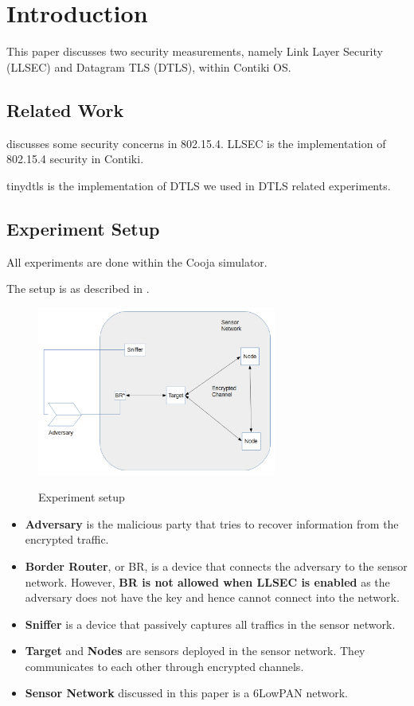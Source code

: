 \chapter{Introduction}
This paper discusses two security measurements, namely Link Layer Security (LLSEC) and Datagram TLS (DTLS), within Contiki OS.

\section{Related Work}
\cite{802154Sec} discusses some security concerns in 802.15.4.  LLSEC\cite{LLSEC} is the implementation of 802.15.4 security in Contiki.

tinydtls\cite{tinydtls} is the implementation of DTLS we used in DTLS related experiments.

\section{Experiment Setup}
All experiments are done within the Cooja simulator.

The setup is as described in .

\begin{figure}
\centering
{
	\includegraphics[width=0.7\textwidth,]{fig/setup.png}
}
\caption{Experiment setup} \label{fig: Setup}
\end{figure}

\begin{itemize}
\item{\bf Adversary} is the malicious party that tries to recover information from the encrypted traffic.
\item{\bf Border Router}, or BR, is a device that connects the adversary to the sensor network. However, \textbf{BR is not allowed when LLSEC is enabled} as the adversary does not have the key and hence cannot connect into the network. 
\item{\bf Sniffer} is a device that passively captures all traffics in the sensor network. 
\item{\bf Target} and {\bf Nodes} are sensors deployed in the sensor network. They communicates to each other through encrypted channels.
\item{\bf Sensor Network} discussed in this paper is a 6LowPAN network.
\end{itemize}

